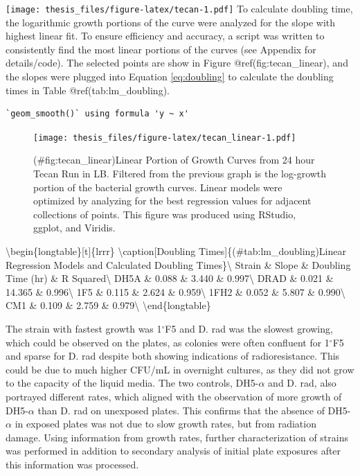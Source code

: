 \documentclass[12pt,twoside]{reedthesis}
\begin{document}
\texttt{[image: thesis\_files/figure-latex/tecan-1.pdf]}
To calculate doubling time, the logarithmic growth portions of the curve were analyzed for the slope with highest linear fit. To ensure efficiency and accuracy, a script was written to consistently find the most linear portions of the curves (see Appendix for details/code). The selected points are show in Figure @ref(fig:tecan\_linear), and the slopes were plugged into Equation \ref{eq:doubling} to calculate the doubling times in Table @ref(tab:lm\_doubling).
\begin{verbatim}
`geom_smooth()` using formula 'y ~ x'
\end{verbatim}
\begin{figure}
\centering
\texttt{[image: thesis\_files/figure-latex/tecan\_linear-1.pdf]}
\caption{(\#fig:tecan\_linear)Linear Portion of Growth Curves from 24 hour Tecan Run in LB. Filtered from the previous graph is the log-growth portion of the bacterial growth curves. Linear models were optimized by analyzing for the best regression values for adjacent collections of points. This figure was produced using RStudio, ggplot, and Viridis.}
\end{figure}
\textbackslash begin\{longtable\}{[}t{]}\{lrrr\}
\textbackslash caption{[}Doubling Times{]}\{(\#tab:lm\_doubling)Linear Regression Models and Calculated Doubling Times\}\textbackslash{}
\toprule
Strain \& Slope \& Doubling Time (hr) \& R Squared\textbackslash{}
\midrule
DH5A \& 0.088 \& 3.440 \& 0.997\textbackslash{}
DRAD \& 0.021 \& 14.365 \& 0.996\textbackslash{}
1F5 \& 0.115 \& 2.624 \& 0.959\textbackslash{}
1FH2 \& 0.052 \& 5.807 \& 0.990\textbackslash{}
CM1 \& 0.109 \& 2.759 \& 0.979\textbackslash{}
\bottomrule
\textbackslash end\{longtable\}

The strain with fastest growth was 1\(^{\circ}\)F5 and D. rad was the slowest growing, which could be observed on the plates, as colonies were often confluent for 1\(^{\circ}\)F5 and sparse for D. rad despite both showing indications of radioresistance. This could be due to much higher CFU/mL in overnight cultures, as they did not grow to the capacity of the liquid media. The two controls, DH5-\(\alpha\) and D. rad, also portrayed different rates, which aligned with the observation of more growth of DH5-\(\alpha\) than D. rad on unexposed plates. This confirms that the absence of DH5-\(\alpha\) in exposed plates was not due to slow growth rates, but from radiation damage. Using information from growth rates, further characterization of strains was performed in addition to secondary analysis of initial plate exposures after this information was processed.
\end{document}
